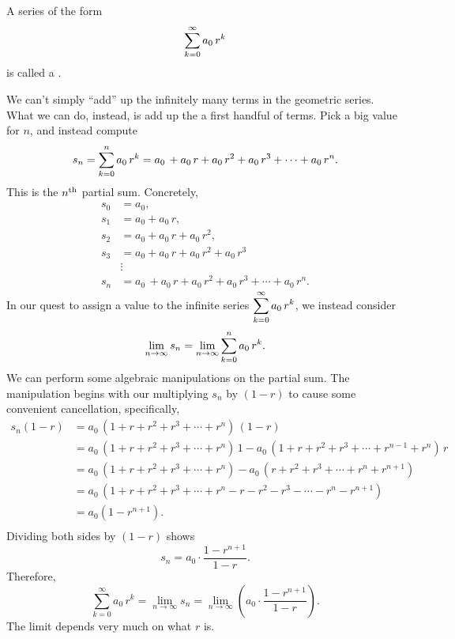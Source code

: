 
\begin{definition}
A series of the form
$$
\displaystyle\sum_{k=0}^\infty a_0 \, r^k
$$
is called a .
\end{definition}

We can't simply ``add'' up the infinitely many terms in the geometric
series.  What we can do, instead, is add up the a first handful of
terms.  Pick a big value for $n$, and instead compute
$$
s_n = \displaystyle\sum_{k=0}^n a_0\, r^k = a_0\, +a_0\, r+a_0\, r^2+a_0\, r^3+\cdots+a_0\, r^n.
$$
This is the $n^{\mbox{\scriptsize th}}$ partial sum.  Concretely,
\begin{align*}
s_0 &= a_0, \\
s_1 &= a_0 + a_0\, r, \\
s_2 &= a_0 + a_0\, r + a_0 \, r^2, \\
s_3 &= a_0 + a_0\, r + a_0 \, r^2 + a_0 \, r^3 \\
& \vdots \\
s_n &= a_0\, +a_0\, r+a_0\, r^2+a_0\, r^3+\cdots+a_0\, r^n.
\end{align*}
In our quest to assign a value to the infinite series
$\displaystyle\sum_{k=0}^\infty a_0 \, r^k$, we instead consider
$$
\lim_{n \to \infty} s_n = \lim_{n \to \infty} \displaystyle\sum_{k=0}^n a_0 \, r^k.
$$
We can perform some algebraic manipulations on the partial sum.
The manipulation begins with our multiplying $s_n$ by $(1-r)$ to cause some
convenient cancellation, specifically,
\begin{align*}
  s_n(1-r) &= a_0\, (1+r+r^2+r^3 + \cdots + r^n) \, (1-r) \\
  &=a_0\, (1+r+r^2+r^3+\cdots+r^n) \, 1 - a_0\, (1+r+r^2+r^3+\cdots+r^{n-1}+r^n)\, r \\
  &=a_0\, (1+r+r^2+r^3+\cdots+r^n) - a_0\, (r+r^2+r^3+\cdots+r^n+r^{n+1}) \\
  &=a_0 \, (1+r+r^2+r^3+\cdots+r^n-r-r^2-r^3-\cdots-r^n-r^{n+1}) \\
  &=a_0(1-r^{n+1}). \\
\end{align*}
Dividing both sides by $(1-r)$ shows
$$
s_n = a_0 \cdot \frac{1 - r^{n+1}}{1-r}.
$$
Therefore,
$$
\sum_{k=0}^\infty a_0 \, r^k = \lim_{n \to \infty} s_n = \lim_{n \to \infty} \left( a_0 \cdot \frac{1 - r^{n+1}}{1-r} \right).
$$
The limit depends very much on what $r$ is.

